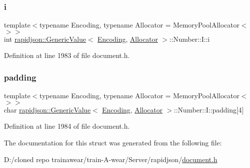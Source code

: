 \subsubsection{\texorpdfstring{i}{i}}
{\footnotesize\ttfamily template$<$typename Encoding, typename Allocator = Memory\+Pool\+Allocator$<$$>$$>$ \\
int \mbox{\hyperlink{classrapidjson_1_1_generic_value}{rapidjson\+::\+Generic\+Value}}$<$ \mbox{\hyperlink{classrapidjson_1_1_encoding}{Encoding}}, \mbox{\hyperlink{classrapidjson_1_1_allocator}{Allocator}} $>$\+::Number\+::\+I\+::i}



Definition at line 1983 of file document.\+h.

\mbox{\label{structrapidjson_1_1_generic_value_1_1_number_1_1_i_ae0b11ea3695bf3abb23d5cef1f1517d2}} 
\subsubsection{\texorpdfstring{padding}{padding}}
{\footnotesize\ttfamily template$<$typename Encoding, typename Allocator = Memory\+Pool\+Allocator$<$$>$$>$ \\
char \mbox{\hyperlink{classrapidjson_1_1_generic_value}{rapidjson\+::\+Generic\+Value}}$<$ \mbox{\hyperlink{classrapidjson_1_1_encoding}{Encoding}}, \mbox{\hyperlink{classrapidjson_1_1_allocator}{Allocator}} $>$\+::Number\+::\+I\+::padding\mbox{[}4\mbox{]}}



Definition at line 1984 of file document.\+h.



The documentation for this struct was generated from the following file\+:\begin{DoxyCompactItemize}
\item 
D\+:/cloned repo trainawear/train-\/\+A-\/wear/\+Server/rapidjson/\mbox{\hyperlink{document_8h}{document.\+h}}\end{DoxyCompactItemize}
